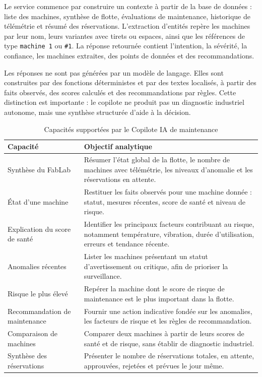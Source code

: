 Le service commence par construire un contexte à partir de la base de données : liste des machines, synthèse de flotte, évaluations de maintenance, historique de télémétrie et résumé des réservations. L'extraction d'entités repère les machines par leur nom, leurs variantes avec tirets ou espaces, ainsi que les références de type \texttt{machine 1} ou \texttt{\#1}. La réponse retournée contient l'intention, la sévérité, la confiance, les machines extraites, des points de données et des recommandations.

Les réponses ne sont pas générées par un modèle de langage. Elles sont construites par des fonctions déterministes et par des textes localisés, à partir des faits observés, des scores calculés et des recommandations par règles. Cette distinction est importante : le copilote ne produit pas un diagnostic industriel autonome, mais une synthèse structurée d'aide à la décision.

\begin{table}[H]
\centering
\small
\caption{Capacités supportées par le Copilote IA de maintenance}
\label{tab:capacites-copilote-ia}
\begin{tabular}{|p{}|p{}|}
\hline
\rowcolor{SectionColor!12}
\textbf{Capacité} & \textbf{Objectif analytique} \\
\hline
Synthèse du FabLab & Résumer l'état global de la flotte, le nombre de machines avec télémétrie, les niveaux d'anomalie et les réservations en attente. \\
\hline
État d'une machine & Restituer les faits observés pour une machine donnée : statut, mesures récentes, score de santé et niveau de risque. \\
\hline
Explication du score de santé & Identifier les principaux facteurs contribuant au risque, notamment température, vibration, durée d'utilisation, erreurs et tendance récente. \\
\hline
Anomalies récentes & Lister les machines présentant un statut d'avertissement ou critique, afin de prioriser la surveillance. \\
\hline
Risque le plus élevé & Repérer la machine dont le score de risque de maintenance est le plus important dans la flotte. \\
\hline
Recommandation de maintenance & Fournir une action indicative fondée sur les anomalies, les facteurs de risque et les règles de recommandation. \\
\hline
Comparaison de machines & Comparer deux machines à partir de leurs scores de santé et de risque, sans établir de diagnostic industriel. \\
\hline
Synthèse des réservations & Présenter le nombre de réservations totales, en attente, approuvées, rejetées et prévues le jour même. \\
\hline
\end{tabular}
\end{table}

